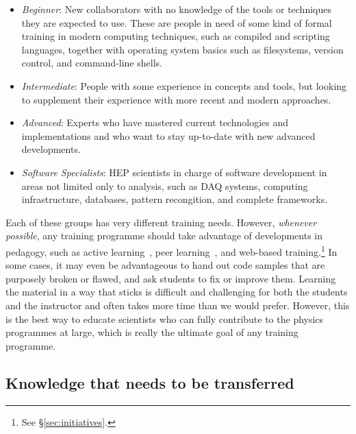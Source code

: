 \documentclass[12pt,a4paper]{article}
\begin{document}
\begin{itemize}
   \item \emph{Beginner}: New collaborators with no knowledge of the
   tools or techniques they are expected to use. These are people in need of some kind of formal
   training in modern computing techniques, such as compiled and scripting
   languages, together with operating system basics such as filesystems, version
   control, and command-line shells.
   \item \emph{Intermediate}: People with some experience in
   concepts and tools, but looking to supplement their
   experience with more recent and modern approaches.
   \item \emph{Advanced}: Experts who have mastered current
   technologies and implementations and who want to stay up-to-date with
   new advanced developments.
   \item \emph{Software Specialists}: HEP scientists in charge of software
   development in areas not limited only to analysis, such as DAQ systems,
   computing infrastructure, databases, pattern recongition, and complete
   frameworks.
\end{itemize}

Each of these groups has very different training needs. However,
\emph{whenever possible}, any training programme should take advantage of
developments in pedagogy, such as active
learning~\cite{ActiveLearning}, peer learning~\cite{PeerLearning}, and
web-based training.\footnote{See \S\ref{sec:initiatives}.} In some cases, it may
even be advantageous to hand out code samples that are purposely broken or
flawed, and ask students to fix or improve them. Learning the material in a way
that sticks is difficult and challenging for both the students
and the instructor and often takes more time than we would prefer. However, this
is the best way to educate scientists who can fully
contribute to the physics programmes at large, which is really the ultimate goal
of any training programme.

\subsection{Knowledge that needs to be transferred}
\end{document}
